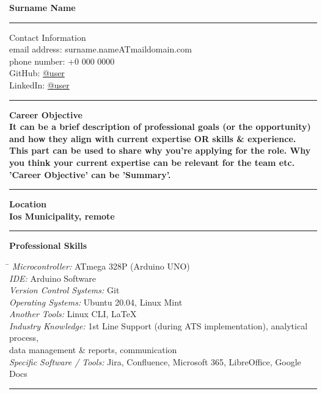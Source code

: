 \documentclass[oneside,final,10pt]{extreport}
\begin{document}
\bfseries
Surname Name \\
\rule{\textwidth}{0.4pt}
Contact Information \\
\noindent
\mdseries
email address: 
surname.nameATmaildomain.com \\
phone number: 
+0 000 0000 \\
GitHub:
\href{https://github.com/user}{@user} \\
LinkedIn:
\href{https://www.linkedin.com/in/username}{@user} \\
\rule{\textwidth}{0.4pt}

\bfseries
Career Objective \\
\mdseries
It can be a brief description of professional goals (or the opportunity) and how they align with current expertise OR skills \& experience. \\
This part can be used to share why you're applying for the role. Why you think your current expertise can be relevant for the team etc. \\
'Career Objective' can be 'Summary'. \\[5pt]
\rule{\textwidth}{0.4pt}

\bfseries
Location \\
\mdseries
Ios Municipality, remote \\
\rule{\textwidth}{0.4pt}

\bfseries
Professional Skills %
\mdseries
	\begin{tabbing}
		\hspace{12em} \= \hspace{8em} \kill
		\textsl{Microcontroller:} \> ATmega 328P (Arduino UNO) \\
		\textsl{IDE:} \> Arduino Software \\ %
		\textsl{Version Control Systems:} \> Git \\
		\textsl{Operating Systems:} \> Ubuntu 20.04, Linux Mint \\ 
		\textsl{Another Tools:} \> Linux CLI, LaTeX \\
		\textsl{Industry Knowledge:} \> 1st Line Support (during ATS implementation), analytical process,\\
		\> data management \& reports, communication \\
		\textsl{Specific Software / Tools:} \> Jira, Confluence, Microsoft 365, LibreOffice, Google Docs \\
	\end{tabbing}
\rule{\textwidth}{0.4pt}
\end{document}
